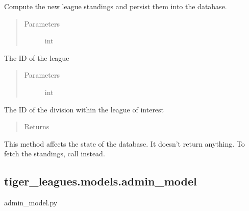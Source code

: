 \documentclass[letterpaper,10pt,english]{sphinxmanual}
\begin{document}
\begin{fulllineitems}
\label{\detokenize{tiger_leagues/models/readme:tiger_leagues.models.league_model.update_league_standings}}
Compute the new league standings and persist them into the database.
\begin{quote}\begin{description}
\item[{Parameters}] \leavevmode
{} \textendash{} int

\end{description}\end{quote}

The ID of the league
\begin{quote}\begin{description}
\item[{Parameters}] \leavevmode
{} \textendash{} int

\end{description}\end{quote}

The ID of the division within the league of interest
\begin{quote}\begin{description}
\item[{Returns}] \leavevmode
{}

\end{description}\end{quote}

This method affects the state of the database. It doesn’t return anything. 
To fetch the standings, call  instead.

\end{fulllineitems}



\subsection{tiger\_leagues.models.admin\_model}
\label{\detokenize{tiger_leagues/models/readme:module-tiger_leagues.models.admin_model}}\label{\detokenize{tiger_leagues/models/readme:tiger-leagues-models-admin-model}}
admin\_model.py
\end{document}

